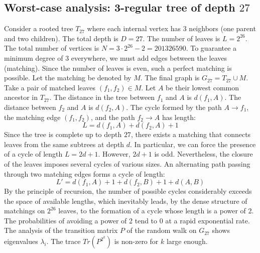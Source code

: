 \documentclass[11pt,a4paper]{article}
\begin{document}
\subsection{Worst-case analysis: 3-regular tree of depth $27$}
Consider a rooted tree $T_{27}$ where each internal vertex has 3 neighbors (one parent and two children).
The total depth is $D = 27$.
The number of leaves is $L = 2^{26}$.
The total number of vertices is $N = 3 \cdot 2^{26} - 2 = 201326590$.
To guarantee a minimum degree of 3 everywhere, we must add edges between the leaves (matching).
Since the number of leaves is even, such a perfect matching is possible.
Let the matching be denoted by $M$. The final graph is $G_{27} = T_{27} \cup M$.
Take a pair of matched leaves $(f_1, f_2) \in M$.
Let $A$ be their lowest common ancestor in $T_{27}$.
The distance in the tree between $f_1$ and $A$ is $d(f_1, A)$.
The distance between $f_2$ and $A$ is $d(f_2, A)$.
The cycle formed by the path $A \to f_1$, the matching edge $(f_1, f_2)$, and the path $f_2 \to A$ has length:
$$ L = d(f_1, A) + d(f_2, A) + 1 $$
Since the tree is complete up to depth $27$, there exists a matching that connects leaves from the same subtrees at depth $d$.
In particular, we can force the presence of a cycle of length $L = 2d + 1$. However, $2d+1$ is odd.
Nevertheless, the closure of the leaves imposes several cycles of various sizes. An alternating path passing through two matching edges forms a cycle of length:
$$ L' = d(f_1, A) + 1 + d(f_2, B) + 1 + d(A, B) $$
By the principle of recursion, the number of possible cycles considerably exceeds the space of available lengths, which inevitably leads, by the dense structure of matchings on $2^{26}$ leaves, to the formation of a cycle whose length is a power of 2. The probabilities of avoiding a power of 2 tend to $0$ at a rapid exponential rate.
The analysis of the transition matrix $P$ of the random walk on $G_{27}$ shows eigenvalues $\lambda_i$. The trace $Tr(P^{2^k})$ is non-zero for $k$ large enough.
\end{document}
